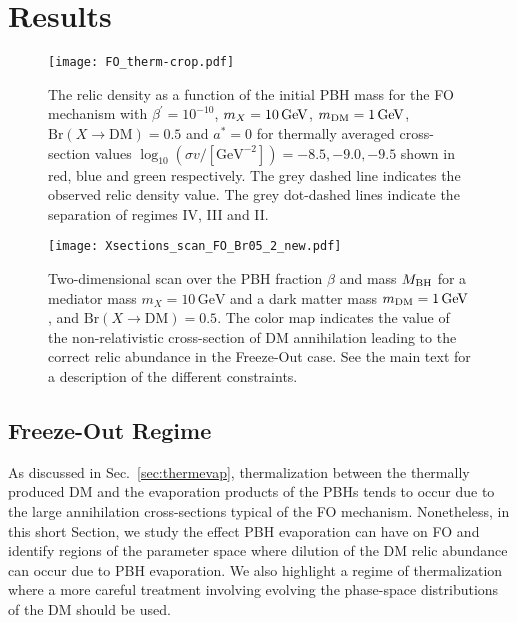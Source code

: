 \documentclass[aps,prd,reprint,twocolumn,preprintnumbers,floatfix,nofootinbib]{revtex4-1}
\newcommand{\mDM}{m_{\rm DM}}
\newcommand{\MBH}{M_{\rm BH}}
\newcommand{\secref}[1]{Sec.~\ref{#1}}
\begin{document}
\section{Results}\label{sec:results}
\begin{figure}[t!]
\centering
 \texttt{[image: FO\_therm-crop.pdf]}
 \caption{\label{fig:FO-therm}The relic density as a function of the initial PBH mass for the FO mechanism with $\beta^\prime = 10^{-10}$,  $m_X = 10\,\rm{GeV}$, $\mDM = 1\, \rm{GeV}$,  $\mathrm{Br}(X\to \mathrm{DM}) = 0.5$ and $a^{*}=0$ for
thermally averaged cross-section values $\log_{10}(\sigma v/[\text{GeV}^{-2}]) =  -8.5, -9.0, -9.5$ shown in red, blue and green  respectively. The grey dashed line indicates the observed relic density value. The grey dot-dashed lines indicate the separation of regimes IV, III and II.}
\end{figure}
\begin{figure*}
    \centering
    \texttt{[image: Xsections\_scan\_FO\_Br05\_2\_new.pdf]}
    \caption{\label{fig:scan_FO}\footnotesize Two-dimensional scan over the PBH fraction $\beta$ and mass $\MBH$ for a mediator mass $m_X=10\,\mathrm{GeV}$ and a dark matter mass $m_{\rm DM}=1\,\mathrm{GeV}$, and $\mathrm{Br}(X\to \mathrm{DM})=0.5$. The color map indicates the value of the non-relativistic cross-section of DM annihilation leading to the correct relic abundance in the Freeze-Out case. See the main text for a description of the different constraints.}
\end{figure*}
\subsection{Freeze-Out Regime}\label{sec:FO}
As discussed in \secref{sec:thermevap},  thermalization  between the thermally produced DM 
 and the evaporation products of the PBHs  tends to occur due to the large annihilation cross-sections
typical of the FO mechanism.
Nonetheless, in this short Section, we study the effect PBH evaporation can have on FO and identify regions
of the parameter space where dilution of the DM relic abundance can occur due to PBH evaporation. We also highlight a regime of thermalization where a more careful treatment involving evolving the phase-space distributions of the DM should be used. 
\end{document}
